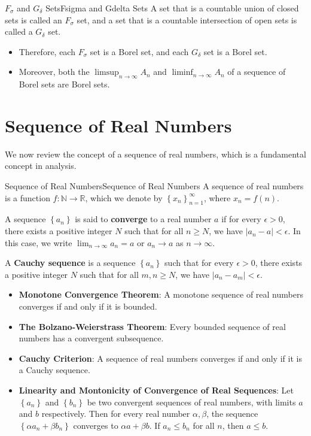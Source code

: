 \documentclass[../main.tex]{subfiles}
\begin{document}
\begin{definition}{$F_\sigma$ and $G_\delta$ Sets}{Fsigma and Gdelta Sets}
	A set that is a countable union of closed sets is called an $F_\sigma$ set, and a set that is a countable intersection of open sets is called a $G_\delta$ set.
\end{definition}

\begin{itemize}
	\item Therefore, each $F_\sigma$ set is a Borel set, and each $G_\delta$ set is a Borel set.
	\item Moreover, both the $\limsup_{n \to \infty} A_n$ and $\liminf_{n \to \infty} A_n$ of a sequence of Borel sets are Borel sets.
\end{itemize}

\section{Sequence of Real Numbers}

We now review the concept of a sequence of real numbers, which is a fundamental concept in analysis.
\begin{definition}{Sequence of Real Numbers}{Sequence of Real Numbers}
	A sequence of real numbers is a function $f: \mathbb{N} \to \mathbb{R}$, which we denote by $\left\{ x_n \right\}_{n=1}^{\infty}$, where $x_n = f(n)$.

	A sequence $\left\{ a_n \right\}$ is said to \textbf{converge} to a real number $a$ if for every $\epsilon > 0$, there exists a positive integer $N$ such that for all $n \geq N$, we have $|a_n - a| < \epsilon$. In this case, we write $\lim_{n \to \infty} a_n = a$ or $a_n \to a$ as $n \to \infty$.

	A \textbf{Cauchy sequence} is a sequence $\left\{ a_n \right\}$ such that for every $\epsilon > 0$, there exists a positive integer $N$ such that for all $m,n \geq N$, we have $|a_n - a_m| < \epsilon$.
\end{definition}

\begin{itemize}
	\item \textbf{Monotone Convergence Theorem}: A monotone sequence of real numbers converges if and only if it is bounded.
	\item \textbf{The Bolzano-Weierstrass Theorem}: Every bounded sequence of real numbers has a convergent subsequence.
	\item \textbf{Cauchy Criterion}: A sequence of real numbers converges if and only if it is a Cauchy sequence.
	\item \textbf{Linearity and Montonicity of Convergence of Real Sequences}: Let $\left\{ a_n \right\}$ and $\left\{ b_n \right\}$ be two convergent sequences of real numbers, with limits $a$ and $b$ respectively. Then for every real number $\alpha, \beta$, the sequence $\left\{ \alpha a_n + \beta b_n \right\}$ converges to $\alpha a + \beta b$. If $a_n \leq b_n$ for all $n$, then $a \leq b$.
\end{itemize}
\end{document}
